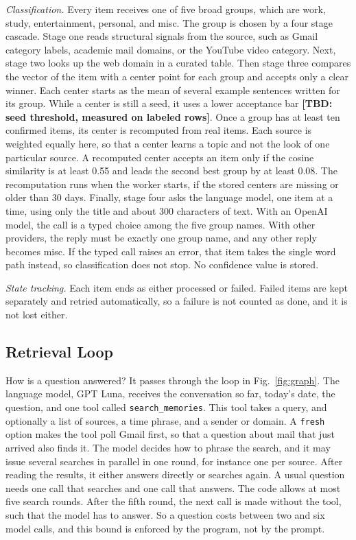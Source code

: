 \documentclass[conference]{IEEEtran}
\newcommand{\llmname}{GPT\nobreakdash-5.6 Luna}
\newcommand{\tbd}[1]{\textbf{[TBD: #1]}}
\begin{document}
\textit{Classification.} Every item receives one of five broad groups, which are work, study, entertainment, personal, and misc. The group is chosen by a four stage cascade. Stage one reads structural signals from the source, such as Gmail category labels, academic mail domains, or the YouTube video category. Next, stage two looks up the web domain in a curated table. Then stage three compares the vector of the item with a center point for each group and accepts only a clear winner. Each center starts as the mean of several example sentences written for its group. While a center is still a seed, it uses a lower acceptance bar \tbd{seed threshold, measured on labeled rows}. Once a group has at least ten confirmed items, its center is recomputed from real items. Each source is weighted equally here, so that a center learns a topic and not the look of one particular source. A recomputed center accepts an item only if the cosine similarity is at least 0.55 and leads the second best group by at least 0.08. The recomputation runs when the worker starts, if the stored centers are missing or older than 30 days. Finally, stage four asks the language model, one item at a time, using only the title and about 300 characters of text. With an OpenAI model, the call is a typed choice among the five group names. With other providers, the reply must be exactly one group name, and any other reply becomes misc. If the typed call raises an error, that item takes the single word path instead, so classification does not stop. No confidence value is stored.

\textit{State tracking.} Each item ends as either processed or failed. Failed items are kept separately and retried automatically, so a failure is not counted as done, and it is not lost either.

\subsection{Retrieval Loop}
How is a question answered? It passes through the loop in Fig.~\ref{fig:graph}. The language model, \llmname{}, receives the conversation so far, today's date, the question, and one tool called \texttt{search\_memories}. This tool takes a query, and optionally a list of sources, a time phrase, and a sender or domain. A \texttt{fresh} option makes the tool poll Gmail first, so that a question about mail that just arrived also finds it.
The model decides how to phrase the search, and it may issue several searches in parallel in one round, for instance one per source. After reading the results, it either answers directly or searches again. A usual question needs one call that searches and one call that answers. The code allows at most five search rounds. After the fifth round, the next call is made without the tool, such that the model has to answer. So a question costs between two and six model calls, and this bound is enforced by the program, not by the prompt.
\end{document}
